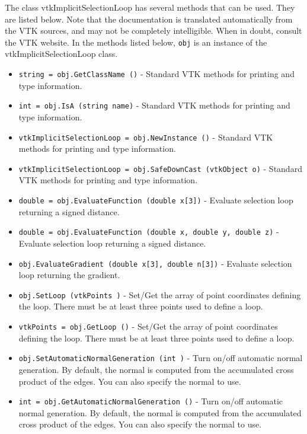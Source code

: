 The class vtkImplicitSelectionLoop has several methods that can be used.
  They are listed below.
Note that the documentation is translated automatically from the VTK sources,
and may not be completely intelligible.  When in doubt, consult the VTK website.
In the methods listed below, \verb|obj| is an instance of the vtkImplicitSelectionLoop class.
\begin{itemize}
\item  \verb|string = obj.GetClassName ()| -  Standard VTK methods for printing and type information.

\item  \verb|int = obj.IsA (string name)| -  Standard VTK methods for printing and type information.

\item  \verb|vtkImplicitSelectionLoop = obj.NewInstance ()| -  Standard VTK methods for printing and type information.

\item  \verb|vtkImplicitSelectionLoop = obj.SafeDownCast (vtkObject o)| -  Standard VTK methods for printing and type information.

\item  \verb|double = obj.EvaluateFunction (double x[3])| -  Evaluate selection loop returning a signed distance.

\item  \verb|double = obj.EvaluateFunction (double x, double y, double z)| -  Evaluate selection loop returning a signed distance.

\item  \verb|obj.EvaluateGradient (double x[3], double n[3])| -  Evaluate selection loop returning the gradient.

\item  \verb|obj.SetLoop (vtkPoints )| -  Set/Get the array of point coordinates defining the loop. There must
 be at least three points used to define a loop.

\item  \verb|vtkPoints = obj.GetLoop ()| -  Set/Get the array of point coordinates defining the loop. There must
 be at least three points used to define a loop.

\item  \verb|obj.SetAutomaticNormalGeneration (int )| -  Turn on/off automatic normal generation. By default, the normal is
 computed from the accumulated cross product of the edges. You can also
 specify the normal to use.

\item  \verb|int = obj.GetAutomaticNormalGeneration ()| -  Turn on/off automatic normal generation. By default, the normal is
 computed from the accumulated cross product of the edges. You can also
 specify the normal to use.


\end{itemize}
